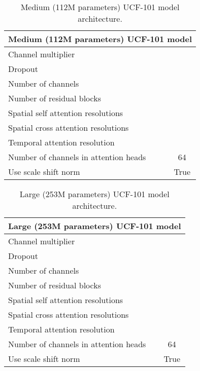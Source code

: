 \documentclass[10pt,twocolumn,letterpaper]{article}
\begin{document}
\begin{table}[!ht]
    \centering
    \caption{Medium (112M parameters) UCF-101 model architecture.}
    \vspace{-1mm}
    \label{tab:ucf_arch_medium}
    \begin{tabular}{l c}
        \toprule
        \multicolumn{2}{c}{Medium (112M parameters) UCF-101 model}\\
        \midrule
        Channel multiplier &  \\
        Dropout &  \\
        Number of channels &  \\
        Number of residual blocks &  \\
        Spatial self attention resolutions &  \\
        Spatial cross attention resolutions &  \\
        Temporal attention resolution &  \\
        Number of channels in attention heads & 64\\
        Use scale shift norm & True \\
        \bottomrule
    \end{tabular}
\end{table}

\begin{table}[!ht]
    \centering
    \caption{Large (253M parameters) UCF-101 model architecture.}
    \vspace{-1mm}
    \label{tab:ucf_arch_large}
    \begin{tabular}{l c}
        \toprule
        \multicolumn{2}{c}{Large (253M parameters) UCF-101 model}\\
        \midrule
        Channel multiplier &  \\
        Dropout &  \\
        Number of channels &  \\
        Number of residual blocks &  \\
        Spatial self attention resolutions &  \\
        Spatial cross attention resolutions &  \\
        Temporal attention resolution &  \\
        Number of channels in attention heads & 64\\
        Use scale shift norm & True \\
        \bottomrule
    \end{tabular}
\end{table}
\end{document}
